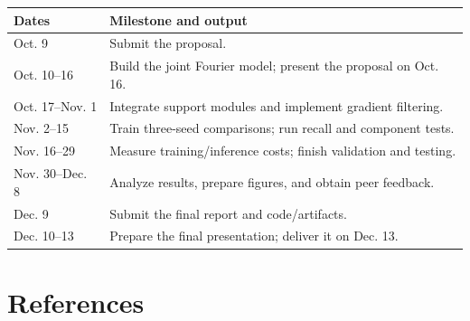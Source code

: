 \documentclass[11pt,letterpaper]{article}
\begin{document}
\smallskip\begin{tabularx}{\textwidth}{@{}p{3.2cm}X@{}}\toprule
\textbf{Dates} & \textbf{Milestone and output}\\\midrule
Oct. 9 & Submit the proposal.\\
Oct. 10–16 & Build the joint Fourier model; present the proposal on Oct. 16.\\
Oct. 17–Nov. 1 & Integrate support modules and implement gradient filtering.\\
Nov. 2–15 & Train three-seed comparisons; run recall and component tests.\\
Nov. 16–29 & Measure training/inference costs; finish validation and testing.\\
Nov. 30–Dec. 8 & Analyze results, prepare figures, and obtain peer feedback.\\
Dec. 9 & Submit the final report and code/artifacts.\\
Dec. 10–13 & Prepare the final presentation; deliver it on Dec. 13.\\
\bottomrule\end{tabularx}\smallskip

\newpage
\section*{References}
\end{document}
